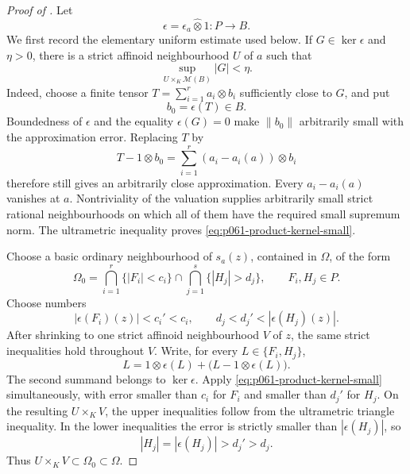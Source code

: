
\begin{proof}[Proof of ]
Let
\[
 \epsilon=\epsilon_a\widehat\otimes1:P\longrightarrow B.
\]
We first record the elementary uniform estimate used below.  If
\(G\in\ker\epsilon\) and \(\eta>0\), there is a strict affinoid
neighbourhood \(U\) of \(a\) such that
\begin{equation}
\label{eq:p061-product-kernel-small}
       \sup_{U\times_K\mathcal M(B)}|G|<\eta.
\end{equation}
Indeed, choose a finite tensor
\(T=\sum_{i=1}^r a_i\otimes b_i\) sufficiently close to \(G\), and put
\[
                  b_0=\epsilon(T)\in B.
\]
Boundedness of \(\epsilon\) and the equality \(\epsilon(G)=0\) make
\(\lVert b_0\rVert\) arbitrarily small with the approximation error.
Replacing \(T\) by
\[
 T-1\otimes b_0
   =\sum_{i=1}^r(a_i-a_i(a))\otimes b_i
\]
therefore still gives an arbitrarily close approximation.  Every
\(a_i-a_i(a)\) vanishes at
\(a\).  Nontriviality of the valuation supplies arbitrarily small strict
rational neighbourhoods on which all of them have the required small
supremum norm.  The ultrametric inequality proves
\eqref{eq:p061-product-kernel-small}.

Choose a basic ordinary neighbourhood of \(s_a(z)\), contained in
\(\Omega\), of the form
\[
 \Omega_0=
 \bigcap_{i=1}^r\{|F_i|<c_i\}
 \cap
 \bigcap_{j=1}^s\{|H_j|>d_j\},
 \qquad F_i,H_j\in P.
\]
Choose numbers
\[
 |\epsilon(F_i)(z)|<c_i'<c_i,
 \qquad
 d_j<d_j'<|\epsilon(H_j)(z)|.
\]
After shrinking to one strict affinoid neighbourhood \(V\) of \(z\), the
same strict inequalities hold throughout \(V\).  Write, for every
\(L\in\{F_i,H_j\}\),
\[
        L=1\otimes\epsilon(L)+
          \bigl(L-1\otimes\epsilon(L)\bigr).
\]
The second summand belongs to \(\ker\epsilon\).  Apply
\eqref{eq:p061-product-kernel-small} simultaneously, with error smaller
than \(c_i\) for \(F_i\) and smaller than \(d_j'\) for \(H_j\).  On the
resulting \(U\times_KV\), the upper inequalities follow from the
ultrametric triangle inequality.  In the lower inequalities the error is
strictly smaller than \(|\epsilon(H_j)|\), so
\[
                     |H_j|=|\epsilon(H_j)|>d_j'>d_j.
\]
Thus \(U\times_KV\subset\Omega_0\subset\Omega\).
\end{proof}

